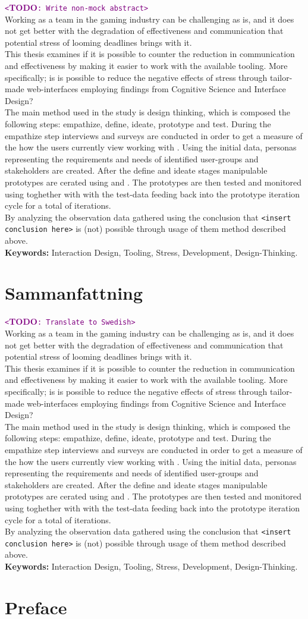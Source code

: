 \documentclass[a4paper,11pt]{article}
\newcommand\TODO[1]{\textcolor{purple}{\texttt{<}\textbf{TODO}\texttt{: #1>}}}
\begin{document}
\TODO{Write non-mock abstract} \\
\def\abs{
  Working as a team in the gaming industry can be challenging as is, and it
  does not get better with the degradation of effectiveness and communication
  that potential stress of looming deadlines brings with it. \\

  This thesis examines if it is possible to counter the reduction
  in communication and effectiveness by making it easier to work with the
  available tooling. More specifically; is is possible
  to reduce the negative effects of stress through tailor-made web-interfaces
  employing findings from Cognitive Science and Interface Design? \\

  The main method used in the study is design thinking, which is composed the
  following steps: empathize, define, ideate, prototype and test. During the
  empathize step interviews and surveys are conducted in order to get a measure
  of the how the users currently view working with {\shotgun}.
  Using the initial data, personas representing the requirements and needs of
  identified user-groups and stakeholders are created.
  After the define and ideate stages manipulable prototypes are cerated using
  {\python} and {\flask}. The prototypes are then tested and monitored using
  {\recordingSystem} toghether with {\reviewProtocol} with the test-data
  feeding back into the prototype iteration cycle for a total of {\numIterations}
  iterations. \\

  By analyzing the observation data gathered using {\recordingSystem} the
  conclusion that {\texttt{<insert conclusion here>}} is (not) possible through
  usage of them method described above. \\

  \textbf{Keywords:}
    Interaction Design,
    Tooling,
    Stress,
    Development,
    Design-Thinking.
}
{\abs}


\newpage

\section*{Sammanfattning}

\TODO{Translate to Swedish} \\
{\abs}

\newpage

\section*{Preface}
\end{document}
